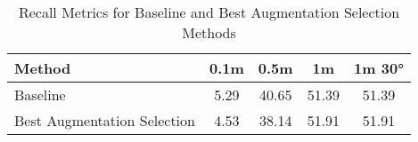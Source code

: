 
\begin{table}[ht]
    \centering
    \begin{tabular}{lcccc}
        \hline
        \textbf{Method} & \textbf{0.1m} & \textbf{0.5m} & \textbf{1m} & \textbf{1m 30°} \\
        \hline

    Baseline & 5.29 & 40.65 & 51.39 & 51.39 \\
    Best Augmentation Selection & 4.53 & 38.14 & 51.91 & 51.91 \\
        \hline
    \end{tabular}
    \caption{Recall Metrics for Baseline and Best Augmentation Selection Methods}
    \label{tab:recall_metrics}
\end{table}
